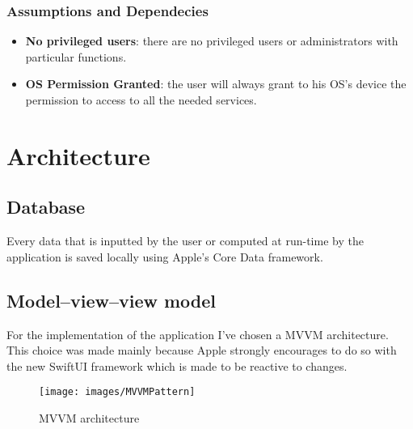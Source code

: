 \documentclass[numbers=noenddot, 12pt, a4paper, oneside]{scrbook}
\begin{document}
\subsection*{Assumptions and Dependecies}
\begin{itemize}
	\item \textbf{No privileged users}: there are no privileged users or administrators with particular functions.
	\item \textbf{OS Permission Granted}: the user will always grant to his OS's device the permission to access to all the needed services.
\end{itemize}


\chapter{Architecture}
\section{Database}
Every data that is inputted by the user or computed at run-time by the application is saved locally using Apple's Core Data framework.

\section{Model–view–view model}
For the implementation of the application I've chosen a MVVM architecture.  This choice was made mainly because Apple strongly encourages to do so with the new SwiftUI framework which is made to be reactive to changes.\\

\begin{figure}[H]
    \centering
    \texttt{[image: images/MVVMPattern]}
    \caption{MVVM architecture}
    \label{fig:my_label}
\end{figure}
\end{document}
